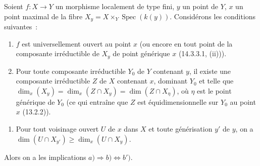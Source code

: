 \begin{proposition}[14.3.13]
\label{IV.14.3.13-fr}
Soient $f:X\to Y$ un morphisme localement de type fini, $y$ un point de $Y$, $x$
un point maximal de la fibre $X_y=X\times_Y\operatorname{Spec}(k(y))$.
Considérons les conditions suivantes~:
\begin{enumerate}[label=\emph{\alph*)}]
  \item $f$ est universellement ouvert au point $x$ (ou encore en tout point de la
  composante irréductible de $X_y$ de point générique $x$ (14.3.3.1, (ii))).
  \item Pour toute composante irréductible $Y_0$ de $Y$ contenant $y$, il existe
  une composante irréductible $Z$ de $X$ contenant $x$, dominant $Y_0$ et telle que
  $\dim_x(X_y)=\dim_x(Z\cap X_y)=\dim(Z\cap X_\eta)$, où $\eta$ est le point
  générique de $Y_0$ (ce qui entraîne que $Z$ est équidimensionnelle sur $Y_0$ au
  point $x$ (13.2.2)).
\end{enumerate}


\begin{enumerate}[label=\emph{\alph*$'$)}]
  \item[b$'$)] Pour tout voisinage ouvert $U$ de $x$ dans $X$ et toute
  générisation $y'$ de $y$, on a
  $\dim(U\cap X_{y'})\geq\dim_x(U\cap X_y)$.
\end{enumerate}
Alors on a les implications $a)\Rightarrow b)\Leftrightarrow b')$.
\end{proposition}

